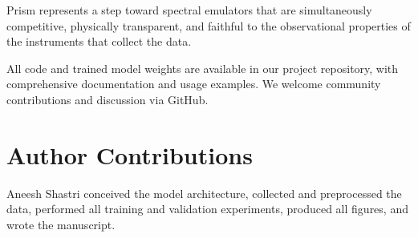 \documentclass[preprint]{aastex701-1/aastex701}
\begin{document}
Prism represents a step toward spectral emulators that are simultaneously competitive,
physically transparent, and faithful to the observational properties of the instruments
that collect the data.

All code and trained model weights are available in our project repository, with
comprehensive documentation and usage examples. We welcome community contributions and
discussion via GitHub.


\section{Author Contributions}
Aneesh Shastri conceived the model architecture, collected and preprocessed the data,
performed all training and validation experiments, produced all figures, and wrote the
manuscript.
\end{document}
